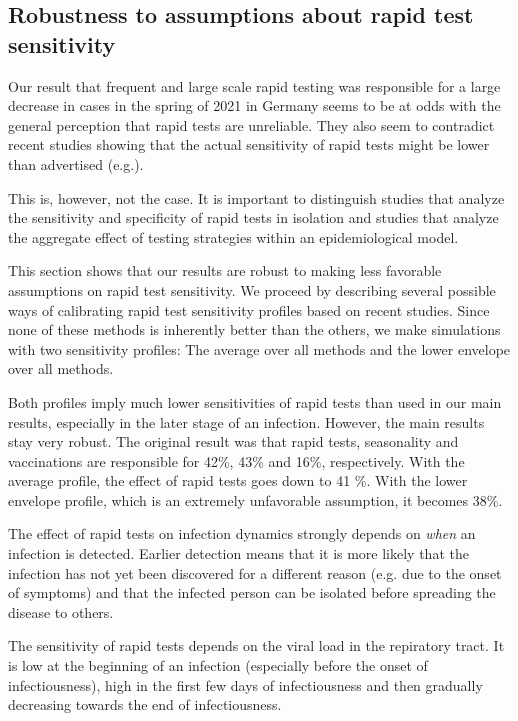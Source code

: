 \subsection{Robustness to assumptions about rapid test sensitivity}
\label{subsec:robustness_rapid_test_sensitivity}


Our result that frequent and large scale rapid testing was responsible for a
large decrease in cases in the spring of 2021 in Germany seems to be at odds
with the general perception that rapid tests are unreliable. They also seem to
contradict recent studies showing that the actual sensitivity of rapid tests
might be lower than advertised (e.g.\cite{Scheiblauer2021}).

This is, however, not the case. It is important to distinguish studies that
analyze the sensitivity and specificity of rapid tests in isolation and studies
that analyze the aggregate effect of testing strategies within an
epidemiological model.

This section shows that our results are robust to making less favorable
assumptions on rapid test sensitivity. We proceed by describing several possible
ways of calibrating rapid test sensitivity profiles based on recent studies.
Since none of these methods is inherently better than the others, we make
simulations with two sensitivity profiles: The average over all methods and the
lower envelope over all methods.

Both profiles imply much lower sensitivities of rapid tests than used in our
main results, especially in the later stage of an infection. However, the main
results stay very robust. The original result was that rapid tests, seasonality
and vaccinations are responsible for 42\%, 43\% and 16\%, respectively. With the
average profile, the effect of rapid tests goes down to 41 \%. With the lower
envelope profile, which is an extremely unfavorable assumption, it becomes 38\%.


The effect of rapid tests on infection dynamics strongly depends on \emph{when}
an infection is detected. Earlier detection means that it is more likely that
the infection has not yet been discovered for a different reason (e.g. due to
the onset of symptoms) and that the infected person can be isolated before
spreading the disease to others.

The sensitivity of rapid tests depends on the viral load in the repiratory
tract. It is low at the beginning of an infection (especially before the onset
of infectiousness), high in the first few days of infectiousness and then
gradually decreasing towards the end of infectiousness.

